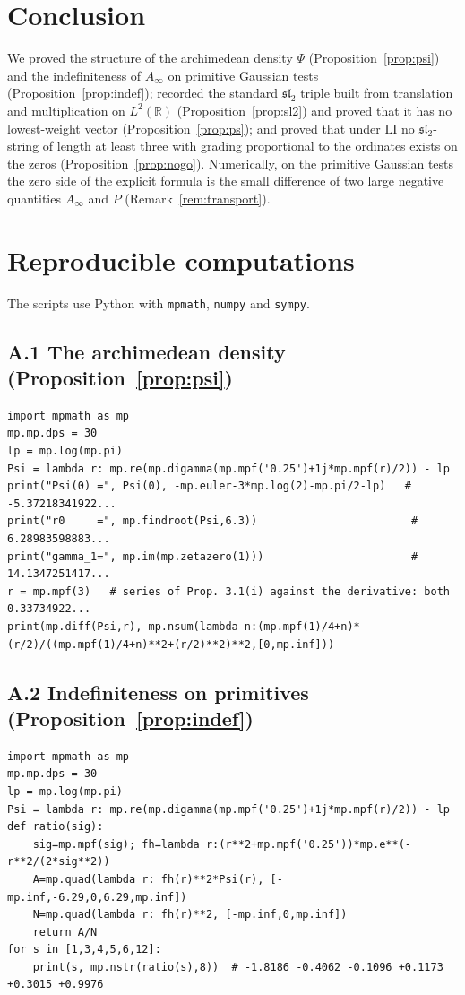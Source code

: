 \documentclass[11pt]{amsart}
\theoremstyle{definition}
\theoremstyle{remark}
\newcommand{\Ainf}{A_\infty}
\newcommand{\sltwo}{\mathfrak{sl}_2}
\begin{document}
\section{Conclusion}
We proved the structure of the archimedean density $\Psi$
(Proposition~\ref{prop:psi}) and the indefiniteness of $\Ainf$ on primitive
Gaussian tests (Proposition~\ref{prop:indef}); recorded the standard $\sltwo$
triple built from translation and multiplication on $L^2(\mathbb R)$
(Proposition~\ref{prop:sl2}) and proved that it has no lowest-weight vector
(Proposition~\ref{prop:ps}); and proved that under $\mathrm{LI}$ no
$\sltwo$-string of length at least three with grading proportional to the
ordinates exists on the zeros (Proposition~\ref{prop:nogo}). Numerically, on the
primitive Gaussian tests the zero side of the explicit formula is the small
difference of two large negative quantities $\Ainf$ and $P$
(Remark~\ref{rem:transport}).

\appendix
\section{Reproducible computations}\label{app:code}
The scripts use Python with \texttt{mpmath}, \texttt{numpy} and \texttt{sympy}.

\subsection*{A.1 The archimedean density (Proposition~\ref{prop:psi})}
\begin{lstlisting}
import mpmath as mp
mp.mp.dps = 30
lp = mp.log(mp.pi)
Psi = lambda r: mp.re(mp.digamma(mp.mpf('0.25')+1j*mp.mpf(r)/2)) - lp
print("Psi(0) =", Psi(0), -mp.euler-3*mp.log(2)-mp.pi/2-lp)   # -5.37218341922...
print("r0     =", mp.findroot(Psi,6.3))                        # 6.28983598883...
print("gamma_1=", mp.im(mp.zetazero(1)))                       # 14.1347251417...
r = mp.mpf(3)   # series of Prop. 3.1(i) against the derivative: both 0.33734922...
print(mp.diff(Psi,r), mp.nsum(lambda n:(mp.mpf(1)/4+n)*(r/2)/((mp.mpf(1)/4+n)**2+(r/2)**2)**2,[0,mp.inf]))
\end{lstlisting}

\subsection*{A.2 Indefiniteness on primitives (Proposition~\ref{prop:indef})}
\begin{lstlisting}
import mpmath as mp
mp.mp.dps = 30
lp = mp.log(mp.pi)
Psi = lambda r: mp.re(mp.digamma(mp.mpf('0.25')+1j*mp.mpf(r)/2)) - lp
def ratio(sig):
    sig=mp.mpf(sig); fh=lambda r:(r**2+mp.mpf('0.25'))*mp.e**(-r**2/(2*sig**2))
    A=mp.quad(lambda r: fh(r)**2*Psi(r), [-mp.inf,-6.29,0,6.29,mp.inf])
    N=mp.quad(lambda r: fh(r)**2, [-mp.inf,0,mp.inf])
    return A/N
for s in [1,3,4,5,6,12]:
    print(s, mp.nstr(ratio(s),8))  # -1.8186 -0.4062 -0.1096 +0.1173 +0.3015 +0.9976
\end{lstlisting}
\end{document}
